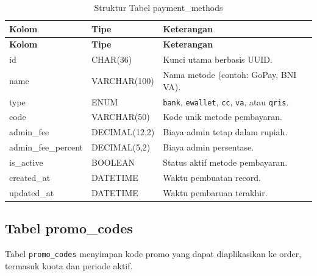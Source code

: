 \documentclass[12pt,a4paper]{report}
\begin{document}
\begin{longtable}{p{3.6cm} p{3.6cm} p{8.5cm}}
\caption{Struktur Tabel payment\_methods} \label{tab:payment-methods} \\
\toprule
\textbf{Kolom} & \textbf{Tipe} & \textbf{Keterangan} \\
\midrule
\endfirsthead
\toprule
\textbf{Kolom} & \textbf{Tipe} & \textbf{Keterangan} \\
\midrule
\endhead
\bottomrule
\endfoot
id                  & CHAR(36)      & Kunci utama berbasis UUID. \\
name                & VARCHAR(100)  & Nama metode (contoh: GoPay, BNI VA). \\
type                & ENUM          & \texttt{bank}, \texttt{ewallet}, \texttt{cc}, \texttt{va}, atau \texttt{qris}. \\
code                & VARCHAR(50)   & Kode unik metode pembayaran. \\
admin\_fee          & DECIMAL(12,2) & Biaya admin tetap dalam rupiah. \\
admin\_fee\_percent & DECIMAL(5,2)  & Biaya admin persentase. \\
is\_active          & BOOLEAN       & Status aktif metode pembayaran. \\
created\_at         & DATETIME      & Waktu pembuatan record. \\
updated\_at         & DATETIME      & Waktu pembaruan terakhir. \\
\end{longtable}

\subsection{Tabel promo\_codes}
Tabel \texttt{promo\_codes} menyimpan kode promo yang dapat diaplikasikan ke order, termasuk kuota dan periode aktif.
\end{document}
